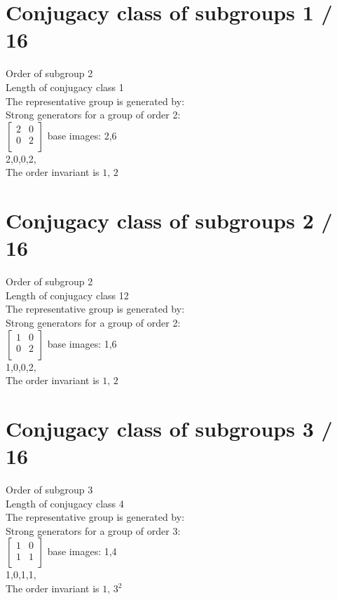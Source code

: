 \section{Conjugacy class of subgroups 1 / 16}
Order of subgroup 2\\
Length of conjugacy class 1\\
The representative group is generated by:\\
Strong generators for a group of order 2:\\
$
\left[
\begin{array}{*{2}{r}}
2 & 0\\
0 & 2\\
\end{array}
\right]
$
base images: 2,6 \\
2,0,0,2,\\
The order invariant is $1,\,2$\\
\section{Conjugacy class of subgroups 2 / 16}
Order of subgroup 2\\
Length of conjugacy class 12\\
The representative group is generated by:\\
Strong generators for a group of order 2:\\
$
\left[
\begin{array}{*{2}{r}}
1 & 0\\
0 & 2\\
\end{array}
\right]
$
base images: 1,6 \\
1,0,0,2,\\
The order invariant is $1,\,2$\\
\section{Conjugacy class of subgroups 3 / 16}
Order of subgroup 3\\
Length of conjugacy class 4\\
The representative group is generated by:\\
Strong generators for a group of order 3:\\
$
\left[
\begin{array}{*{2}{r}}
1 & 0\\
1 & 1\\
\end{array}
\right]
$
base images: 1,4 \\
1,0,1,1,\\
The order invariant is $1,\,3^2$\\
